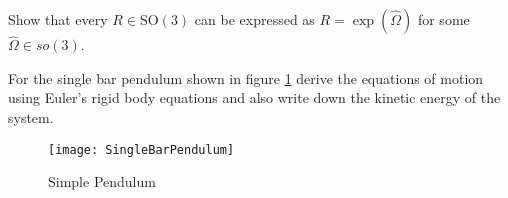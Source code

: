 \documentclass[graybox,envcountchap,sectrefs]{svmonoMuga}
\begin{document}



\begin{exercise}\label{ex:EveryR=Rotation}
Show that every $R\in \mathrm{SO}(3)$ can be expressed as $R=\exp{(\widehat{\Omega})}$ for some $\widehat{\Omega}\in so(3)$.
\end{exercise}






\begin{exercise}
For the single bar pendulum shown in figure \ref{Fig:SingleBarPendulum} derive the equations of motion using Euler's rigid body equations and also write down the 
kinetic energy of the system.
\begin{figure}[ht]
\begin{center}
\texttt{[image: SingleBarPendulum]}
\renewcommand{\baselinestretch}{1}\selectfont
\caption{Simple Pendulum}
\label{Fig:SingleBarPendulum}
\renewcommand{\baselinestretch}{1.5}\selectfont
\end{center}
\end{figure}
\end{exercise}
\end{document}
